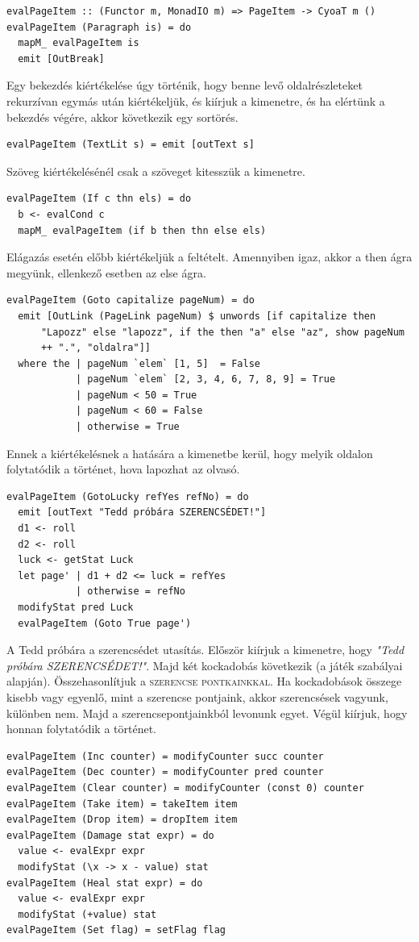 \documentclass[12pt,a4paper,oneside]{report}
\newcommand{\stat}{\textsc}
\begin{document}
  \begin{verbatim}
evalPageItem :: (Functor m, MonadIO m) => PageItem -> CyoaT m ()
evalPageItem (Paragraph is) = do
  mapM_ evalPageItem is
  emit [OutBreak]
  \end{verbatim}
  Egy bekezdés kiértékelése úgy történik, hogy benne levő
  oldalrészleteket rekurzívan egymás után kiértékeljük, és kiírjuk a
  kimenetre, és ha elértünk a bekezdés végére, akkor következik egy
  sortörés.
  \begin{verbatim}
evalPageItem (TextLit s) = emit [outText s]
  \end{verbatim}
  Szöveg kiértékelésénél csak a szöveget kitesszük a kimenetre.
  \begin{verbatim}
evalPageItem (If c thn els) = do
  b <- evalCond c
  mapM_ evalPageItem (if b then thn else els)
  \end{verbatim}
  Elágazás esetén előbb kiértékeljük a feltételt. Amennyiben igaz,
  akkor a then ágra megyünk, ellenkező esetben az else ágra.
  \begin{verbatim}
evalPageItem (Goto capitalize pageNum) = do
  emit [OutLink (PageLink pageNum) $ unwords [if capitalize then
      "Lapozz" else "lapozz", if the then "a" else "az", show pageNum
      ++ ".", "oldalra"]]
  where the | pageNum `elem` [1, 5]  = False
            | pageNum `elem` [2, 3, 4, 6, 7, 8, 9] = True
            | pageNum < 50 = True
            | pageNum < 60 = False
            | otherwise = True
  \end{verbatim}
  Ennek a kiértékelésnek a hatására a kimenetbe kerül, hogy melyik
  oldalon folytatódik a történet, hova lapozhat az olvasó.
  \begin{verbatim}
evalPageItem (GotoLucky refYes refNo) = do
  emit [outText "Tedd próbára SZERENCSÉDET!"]
  d1 <- roll
  d2 <- roll
  luck <- getStat Luck
  let page' | d1 + d2 <= luck = refYes
            | otherwise = refNo
  modifyStat pred Luck
  evalPageItem (Goto True page')
  \end{verbatim}
  A Tedd próbára a szerencsédet utasítás. Először kiírjuk a kimenetre,
  hogy \emph{"Tedd próbára SZERENCSÉDET!"}. Majd két kockadobás következik (a
  játék szabályai alapján). Összehasonlítjuk a \stat{szerencse
  pontkainkkal}. Ha kockadobások összege kisebb vagy egyenlő, mint a
  szerencse pontjaink, akkor szerencsések vagyunk, különben nem. Majd
  a szerencsepontjainkból levonunk egyet. Végül kiírjuk, hogy honnan
  folytatódik a történet.
  \begin{verbatim}
evalPageItem (Inc counter) = modifyCounter succ counter
evalPageItem (Dec counter) = modifyCounter pred counter
evalPageItem (Clear counter) = modifyCounter (const 0) counter
evalPageItem (Take item) = takeItem item
evalPageItem (Drop item) = dropItem item
evalPageItem (Damage stat expr) = do
  value <- evalExpr expr
  modifyStat (\x -> x - value) stat
evalPageItem (Heal stat expr) = do
  value <- evalExpr expr
  modifyStat (+value) stat
evalPageItem (Set flag) = setFlag flag
  \end{verbatim}
\end{document}
